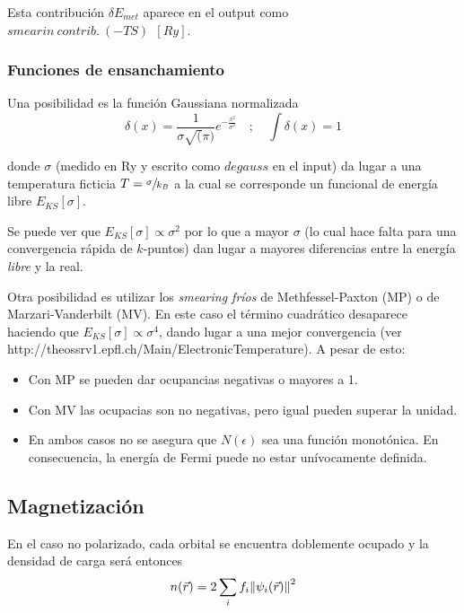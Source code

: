   Esta contribución $\delta E_{met}$ aparece en el output como $smearin\ contrib.\ (-TS)\ \ [Ry]$.

\subsubsection{Funciones de ensanchamiento}

  Una posibilidad es la función Gaussiana normalizada
    $$\delta(x) = \frac{1}{\sigma \sqrt(\pi)} e^{-\frac{x^2}{\sigma^2}} \quad ; \quad \int \delta(x) = 1$$

  donde $\sigma$ (medido en Ry y escrito como $degauss$ en el input) da lugar a una temperatura ficticia $T=\sfrac{\sigma}{k_B}$ a la cual se corresponde un funcional de energía libre $E_{KS} [\sigma]$.

  Se puede ver que $E_{KS} [\sigma] \propto \sigma^2$ por lo que a mayor $\sigma$ (lo cual hace falta para una convergencia rápida de $k$-puntos) dan lugar a mayores diferencias entre la energía \emph{libre} y la real.


  Otra posibilidad es utilizar los \emph{smearing fríos} de Methfessel-Paxton (MP) o de Marzari-Vanderbilt (MV). En este caso el término cuadrático desaparece haciendo que $E_{KS} [\sigma] \propto \sigma^4$, dando lugar a una mejor convergencia (ver http://theossrv1.epfl.ch/Main/ElectronicTemperature). A pesar de esto:
    \begin{itemize}
      \item Con MP se pueden dar ocupancias negativas o mayores a 1.
      \item Con MV las ocupacias son no negativas, pero igual pueden superar la unidad.
      \item En ambos casos no se asegura que $N(\epsilon)$ sea una función monotónica. En consecuencia, la energía de Fermi puede no estar unívocamente definida.
    \end{itemize}

\subsection{Magnetización}

  En el caso no polarizado, cada orbital se encuentra doblemente ocupado y la densidad de carga será entonces
    $$n (\vec{r}) = 2 \sum_i f_i \norm{\psi_i (\vec{r})}^2$$

